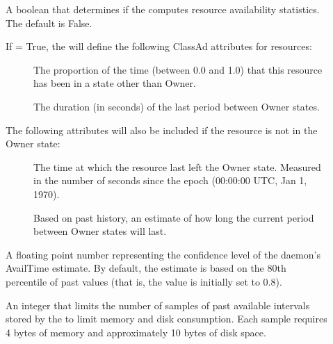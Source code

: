 \begin{description}

\item[]
\label{param:StartdComputeAvailStats}
  A boolean that determines if the  computes resource
  availability statistics.  The default is False.

If  = True, the  will
define the following ClassAd attributes for resources:

\begin{description}
\item[]
  The proportion of the time (between 0.0 and 1.0)
  that this resource has been in a state other than Owner.
\item[]
  The duration (in seconds) of the last period between Owner states.
\end{description}

The following attributes will also be included if the resource is
not in the Owner state:

\begin{description}
\item[]
  The time at which the resource last left the
  Owner state.  Measured in the number of seconds since the
  epoch (00:00:00 UTC, Jan 1, 1970).
\item[]
  Based on past history, an estimate
  of how long the current period between Owner states will last.
\end{description}

\item[]
\label{param:StartdAvailConfidence}
  A floating point number representing the confidence level of the
   daemon's AvailTime estimate.
  By default, the estimate is based on
  the 80th percentile of past values
  (that is, the value is initially set to 0.8).

\item[]
\label{param:StartdMaxAvailPeriodSamples}
  An integer that limits the number of samples of past available
  intervals stored by the  to limit memory and disk consumption.
  Each sample requires 4 bytes of memory and approximately 10 bytes of
  disk space.

\end{description}



